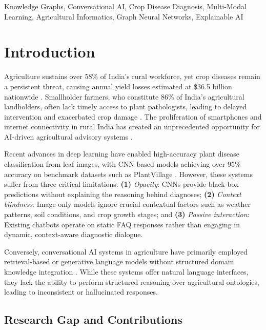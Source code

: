 \documentclass[conference]{IEEEtran}
\begin{document}
\begin{IEEEkeywords}
Knowledge Graphs, Conversational AI, Crop Disease Diagnosis, Multi-Modal Learning, Agricultural Informatics, Graph Neural Networks, Explainable AI
\end{IEEEkeywords}

\section{Introduction}
\label{sec:introduction}

Agriculture sustains over 58\% of India's rural workforce, yet crop diseases remain a persistent threat, causing annual yield losses estimated at \$36.5 billion nationwide \cite{agriloss}. Smallholder farmers, who constitute 86\% of India's agricultural landholders, often lack timely access to plant pathologists, leading to delayed intervention and exacerbated crop damage \cite{smallholder}. The proliferation of smartphones and internet connectivity in rural India has created an unprecedented opportunity for AI-driven agricultural advisory systems \cite{digitalindia}.

Recent advances in deep learning have enabled high-accuracy plant disease classification from leaf images, with CNN-based models achieving over 95\% accuracy on benchmark datasets such as PlantVillage \cite{plantvillage}. However, these systems suffer from three critical limitations: \textbf{(1)} \textit{Opacity}: CNNs provide black-box predictions without explaining the reasoning behind diagnoses; \textbf{(2)} \textit{Context blindness}: Image-only models ignore crucial contextual factors such as weather patterns, soil conditions, and crop growth stages; and \textbf{(3)} \textit{Passive interaction}: Existing chatbots operate on static FAQ responses rather than engaging in dynamic, context-aware diagnostic dialogue.

Conversely, conversational AI systems in agriculture have primarily employed retrieval-based or generative language models without structured domain knowledge integration \cite{agribot_survey}. While these systems offer natural language interfaces, they lack the ability to perform structured reasoning over agricultural ontologies, leading to inconsistent or hallucinated responses.

\subsection{Research Gap and Contributions}
\end{document}
